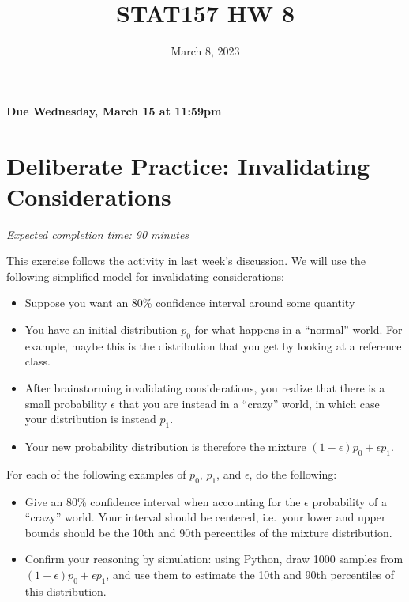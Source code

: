 \documentclass[11pt]{article}
\title{STAT157 HW 8}
\date{March 8, 2023}
\begin{document}
\maketitle

\hfill \textbf{Due Wednesday, March 15 at 11:59pm}

\section*{Deliberate Practice: Invalidating Considerations}

\emph{Expected completion time: 90 minutes}

This exercise follows the activity in last week's discussion.
We will use the following simplified model for invalidating considerations:
\begin{itemize}
	\item Suppose you want an 80\% confidence interval around some quantity
	\item You have an initial distribution $p_0$ for what happens in a “normal” world. For example, maybe this is the distribution that you get by looking at a reference class.
	\item After brainstorming invalidating considerations, you realize that there is a small probability $\epsilon$ that you are instead in a “crazy” world, in which case your distribution is instead $p_1$.
	\item Your new probability distribution is therefore the mixture $(1 - \epsilon) p_0 + \epsilon p_1$.
\end{itemize}

For each of the following examples of $p_0$, $p_1$, and $\epsilon$, do the following:
\begin{itemize}
	\item Give an 80\% confidence interval when accounting for the $\epsilon$ probability of a ``crazy'' world. Your interval should be centered, i.e.~your lower and upper bounds should be the 10th and 90th percentiles of the mixture distribution.
	\item Confirm your reasoning by simulation: using Python, draw 1000 samples from $(1 - \epsilon) p_0 + \epsilon p_1$, and use them to estimate the 10th and 90th percentiles of this distribution.
\end{itemize}
\end{document}
